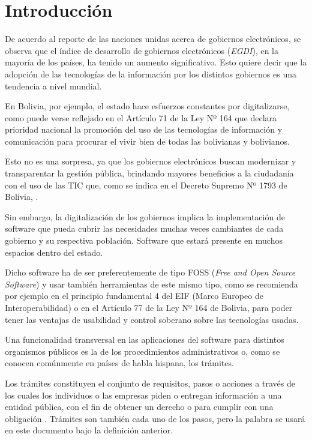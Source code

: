 \section{Introducción}

De acuerdo al reporte de las naciones unidas acerca de gobiernos electrónicos, se observa que el índice de desarrollo de gobiernos electrónicos (\textit{EGDI}), en la mayoría de los países, ha tenido un aumento significativo. Esto quiere decir que la adopción de las tecnologías de la información por los distintos gobiernos es una tendencia a nivel mundial.

En Bolivia, por ejemplo, el estado hace esfuerzos constantes por digitalizarse, como puede verse reflejado en el Artículo 71 de la Ley Nº 164 que declara prioridad nacional la promoción del uso de las tecnologías de información y comunicación para procurar el vivir bien de todas las bolivianas y bolivianos.

Esto no es una sorpresa, ya que los gobiernos electrónicos buscan modernizar y transparentar la gestión pública, brindando mayores beneficios a la ciudadanía con el uso de las TIC que, como se indica en el Decreto Supremo Nº 1793 de Bolivia, .

Sin embargo, la digitalización de los gobiernos implica la implementación de software que pueda cubrir las necesidades muchas veces cambiantes de cada gobierno y su respectiva población. Software que estará presente en muchos espacios dentro del estado.

Dicho software ha de ser preferentemente de tipo FOSS (\textit{Free and Open Source Software}) y usar también herramientas de este mismo tipo, como se recomienda por ejemplo en el principio fundamental 4 del EIF (Marco Europeo de Interoperabilidad) o en el Artículo 77 de la Ley Nº 164 de Bolivia, para poder tener las ventajas de usabilidad y control soberano sobre las tecnologías usadas.

Una funcionalidad transversal en las aplicaciones del software para distintos organismos públicos es la de los procedimientos administrativos o, como se conocen comúnmente en países de habla hispana, los trámites.

Los trámites constituyen el conjunto de requisitos, pasos o acciones a través de los cuales los individuos o las empresas piden o entregan información a una entidad pública, con el fin de obtener un derecho o para cumplir con una obligación \cite{rosethFinTramiteEterno2018}. Trámites son también cada uno de los pasos, pero la palabra se usará en este documento bajo la definición anterior.

